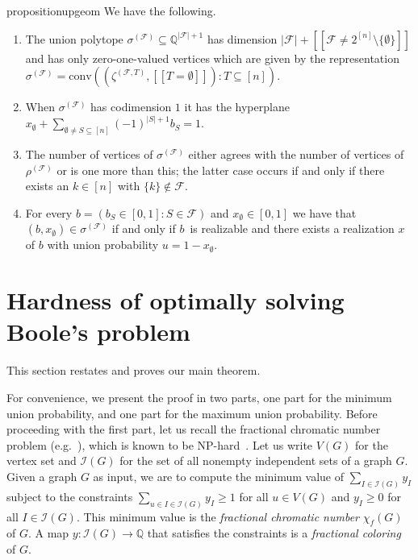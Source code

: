 \documentclass[11pt]{article}
\newcommand{\iv}[1]{\ensuremath{[\![{#1}]\!]}}
\newcommand{\up}{\ensuremath{\sigma}}
\newcommand{\cp}{\ensuremath{\rho}}
\newcommand{\conv}{\text{conv}}
\begin{document}
\begin{restatable}{proposition}{upgeom}
\label{prop:union}
We have the following.
\begin{enumerate}
\item
The union polytope 
$\up^{(\mathcal{F})}\subseteq\mathbb{Q}^{|\mathcal{F}|+1}$ 
has dimension 
$|\mathcal{F}|+\iv{\mathcal{F}\neq 2^{[n]}\setminus\{\emptyset\}}$
and has only zero-one-valued vertices which are given by the 
representation 
$\up^{(\mathcal{F})}=\conv((\zeta^{(\mathcal{F},T)},\iv{T=\emptyset}):T\subseteq[n])$.
\item
When $\up^{(\mathcal{F})}$ has codimension $1$ 
it has the hyperplane
$x_\emptyset+\sum_{\emptyset\neq S\subseteq[n]}(-1)^{|S|+1}b_S = 1$.
\item
The number of vertices of $\up^{(\mathcal{F})}$ either
agrees with the number of vertices of $\cp^{(\mathcal{F})}$
or is one more than this; the latter case occurs if and only if 
there exists an $k\in[n]$ with $\{k\}\notin\mathcal{F}$.
\item
For every $b=(b_S\in[0,1]:S\in\mathcal{F})$ and $x_\emptyset\in[0,1]$
we have that $(b,x_\emptyset)\in\up^{(\mathcal{F})}$ if and only if 
$b$~is realizable and there exists a realization $x$ of $b$ with union 
probability $u=1-x_\emptyset$. 
\end{enumerate}
\end{restatable}


\section{Hardness of optimally solving Boole's problem}

\label{sect:hardness}

This section restates and proves our main theorem. 

\minmaxunion*

For convenience,
we present the proof in two parts, one part for the minimum union
probability, and one part for the maximum union probability. Before proceeding
with the first part, let us recall the fractional chromatic number problem
(e.g.~\cite[Chap.~3]{ScheinermanU1997}), which is known to 
be NP-hard~\cite{LundY1994}. Let us write $V(G)$ for the vertex
set and $\mathcal{I}(G)$ for the 
set of all nonempty independent sets of a graph $G$.
Given a graph $G$ as input, we are to 
compute the minimum value of $\sum_{I\in\mathcal{I}(G)}y_I$
subject to the constraints 
$\sum_{u\in I\in\mathcal{I}(G)}y_I\geq 1$ for all $u\in V(G)$
and $y_I\geq 0$ for all $I\in\mathcal{I}(G)$. This minimum value 
is the {\em fractional chromatic number} $\chi_f(G)$ of $G$. 
A map $y:\mathcal{I}(G)\rightarrow\mathbb{Q}$ that satisfies the constraints
is a {\em fractional coloring} of $G$.
\end{document}
